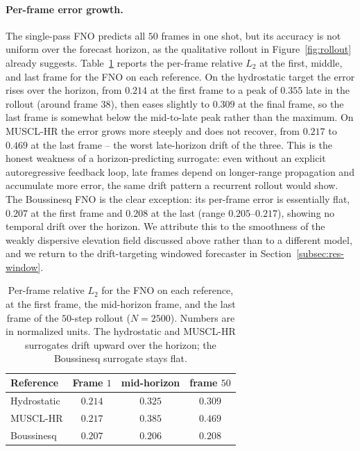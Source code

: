 \paragraph{Per-frame error growth.}
The single-pass FNO predicts all $50$ frames in one shot, but its accuracy is not uniform over the forecast horizon, as the qualitative rollout in Figure~\ref{fig:rollout} already suggests. Table~\ref{tab:perframe} reports the per-frame relative $L_2$ at the first, middle, and last frame for the FNO on each reference. On the hydrostatic target the error rises over the horizon, from $0.214$ at the first frame to a peak of $0.355$ late in the rollout (around frame $38$), then eases slightly to $0.309$ at the final frame, so the last frame is somewhat below the mid-to-late peak rather than the maximum. On MUSCL-HR the error grows more steeply and does not recover, from $0.217$ to $0.469$ at the last frame -- the worst late-horizon drift of the three. This is the honest weakness of a horizon-predicting surrogate: even without an explicit autoregressive feedback loop, late frames depend on longer-range propagation and accumulate more error, the same drift pattern a recurrent rollout would show. The Boussinesq FNO is the clear exception: its per-frame error is essentially flat, $0.207$ at the first frame and $0.208$ at the last (range $0.205$--$0.217$), showing no temporal drift over the horizon. We attribute this to the smoothness of the weakly dispersive elevation field discussed above rather than to a different model, and we return to the drift-targeting windowed forecaster in Section~\ref{subsec:res-window}.

\begin{table}[!htbp]
\centering
\caption{Per-frame relative $L_2$ for the FNO on each reference, at the first frame, the mid-horizon frame, and the last frame of the $50$-step rollout ($N = 2500$). Numbers are in normalized units. The hydrostatic and MUSCL-HR surrogates drift upward over the horizon; the Boussinesq surrogate stays flat.}
\label{tab:perframe}
\begin{tabular}{lccc}
    \toprule
    Reference & Frame $1$ & mid-horizon & frame $50$ \\
    \midrule
    Hydrostatic & $0.214$ & $0.325$ & $0.309$ \\
    MUSCL-HR    & $0.217$ & $0.385$ & $0.469$ \\
    Boussinesq  & $0.207$ & $0.206$ & $0.208$ \\
    \bottomrule
\end{tabular}
\end{table}

